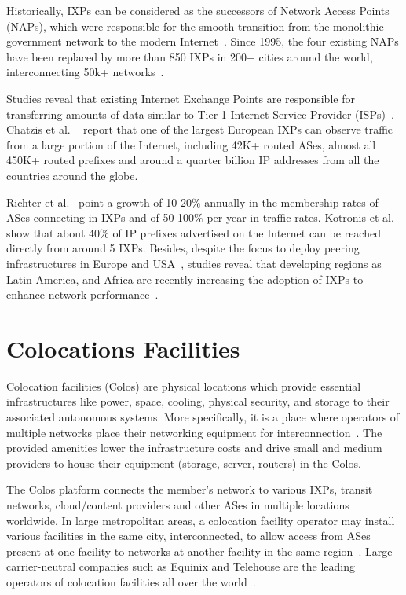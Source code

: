 	Historically, IXPs can be considered as the successors of Network Access Points (NAPs), which were responsible for the smooth transition from the monolithic government network to the modern Internet~\cite{Chatzis:2013}. Since 1995, the four existing NAPs have been replaced by more than 850 IXPs in 200+ cities around the world, interconnecting 50k+ networks~\cite{internetexchangemap, Ager:2012, Giotsas:2015:MPI:2716281.2836122}.

	Studies reveal that existing Internet Exchange Points are responsible for transferring amounts of data similar to Tier 1 Internet Service Provider (ISPs)~\cite{Ager:2012}. Chatzis et al. ~\cite{Chatzis:2013:BUL:2504730.2504746} report that one of the largest European IXPs can observe traffic from a large portion of the Internet, including 42K+ routed ASes, almost all 450K+ routed prefixes and around a quarter billion IP addresses from all the countries around the globe. 

	Richter et al.~\cite{Richter:2014} point a growth of 10-20\% annually in the membership rates of ASes connecting in IXPs and of 50-100\% per year in traffic rates. Kotronis et al.~\cite{Kotronis:2015:IPI:2745844.2745877} show that about 40\% of IP prefixes advertised on the Internet can be reached directly from around 5 IXPs. Besides, despite the focus to deploy peering infrastructures in Europe and USA~\cite{Chatzis:2013, Chatzis:2015:QVO:2717646.2717650}, studies reveal that developing regions as Latin America, and Africa are recently increasing the adoption of IXPs to enhance network performance~\cite{DissectingBrazilianIXP, Fanou:2017:ICC:3131365.3131394}.


	\section{Colocations Facilities}
	\label{subsec:colos}

	Colocation facilities (Colos) are physical locations which provide essential infrastructures like power, space, cooling, physical security, and storage to their associated autonomous systems. More specifically, it is a place where operators of multiple networks place their networking equipment for interconnection~\cite{BITAG}. The provided amenities lower the infrastructure costs and drive small and medium providers to house their equipment (storage, server, routers) in the Colos.

	The Colos platform connects the member's network to various IXPs, transit networks, cloud/content providers and other ASes in multiple locations worldwide. In large metropolitan areas, a colocation facility operator may install various facilities in the same city, interconnected, to allow access from ASes present at one facility to networks at another facility in the same region~\cite{Giotsas:2015:MPI:2716281.2836122}. Large carrier-neutral companies such as Equinix and Telehouse are the leading operators of colocation facilities all over the world~\cite{Kotronis:2017:STC:3131365.3131388}. 

	


	